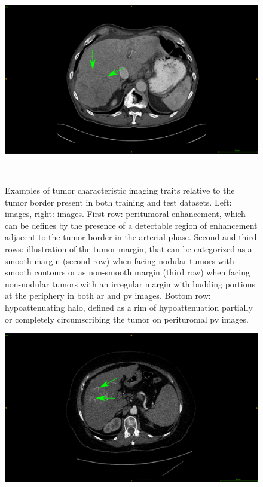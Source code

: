 {\begin{figure}[!ht]
\begin{mdframed}[backgroundcolor=blue!50,linecolor=blue!50]
\begin{minipage}{0.45\linewidth}
		\end{minipage} \hspace{-0.1cm}
		\begin{minipage}{0.45\linewidth}
			\includegraphics[width=\linewidth]{images/ImagingTraits/ResizeTCIA_halo}
		\end{minipage} \\
	\end{mdframed}
	\caption{Examples of tumor characteristic imaging traits relative to the tumor border present in both training and test datasets. Left: \textbf{} images, right: \textbf{} images. First row: peritumoral enhancement, which can be defines by the presence of a detectable region of enhancement adjacent to the tumor border in the arterial phase. Second and third rows: illustration of the tumor margin, that can be categorized as a smooth margin (second row) when facing nodular tumors with smooth contours or as non-smooth margin (third row) when facing non-nodular tumors with an irregular margin with budding portions at the periphery in both \ac{ar} and \ac{pv} images. Bottom row: hypoattenuating halo, defined as a rim of hypoattenuation partially or completely circumscribing the tumor on perituromal \ac{pv} images. }
	\label{fig:InterDb_imagingTraits}
\end{figure}
\begin{figure}[!ht]
	\begin{mdframed}[backgroundcolor=blue!50,linecolor=blue!50]
		\centering
		\begin{minipage}{0.45\linewidth}
			\includegraphics[width=\linewidth]{images/ImagingTraits/ResizeGDB_internalArteries}

\end{minipage}
\end{mdframed}
\end{figure}}
